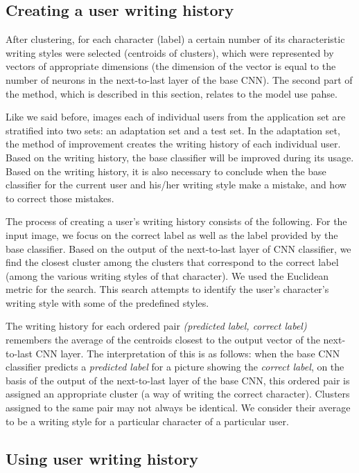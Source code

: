 \documentclass{article}
\begin{document}
\subsection{Creating a user writing history}

After clustering, for each character (label) a certain number of its characteristic writing styles were selected (centroids of clusters), which were represented by vectors of appropriate dimensions
(the dimension of the vector is equal to the number of neurons in the next-to-last layer of the base CNN).
The second part of the method, which is described in this section, relates to the model use pahse.

Like we said before, images each of individual users from the application set are stratified into two sets: an adaptation set and a test set. %
In the adaptation set, the method of improvement creates the writing history of each individual user.
Based on the writing history, the base classifier will be improved during its usage.
Based on the writing history, it is also necessary to conclude when the base classifier for the current user and his/her writing style make a mistake, and how to correct those mistakes.

The process of creating a user's writing history consists of the following.
For the input image, we focus on the correct label as well as the label provided by the base classifier.
Based on the output of the next-to-last layer of CNN classifier, we find the closest cluster among the clusters that correspond to the correct label (among the various writing styles of that character).
We used the Euclidean metric for the search. %
This search attempts to identify the user's character's writing style with some of the predefined styles.

The writing history for each ordered pair \textit{(predicted label, correct label)} remembers the average of the centroids closest to the output vector of the next-to-last CNN layer.
The interpretation of this is as follows: when the base CNN classifier predicts %
 a \textit{predicted label} for a picture showing the \textit{correct label},
on the basis of the output of the next-to-last layer of the base CNN, this ordered pair is assigned an appropriate cluster (a way of writing the correct character).
Clusters assigned to the same pair may not always be identical.
We consider their average to be a writing style for a particular character of a particular user.

\subsection{Using user writing history}
\end{document}
